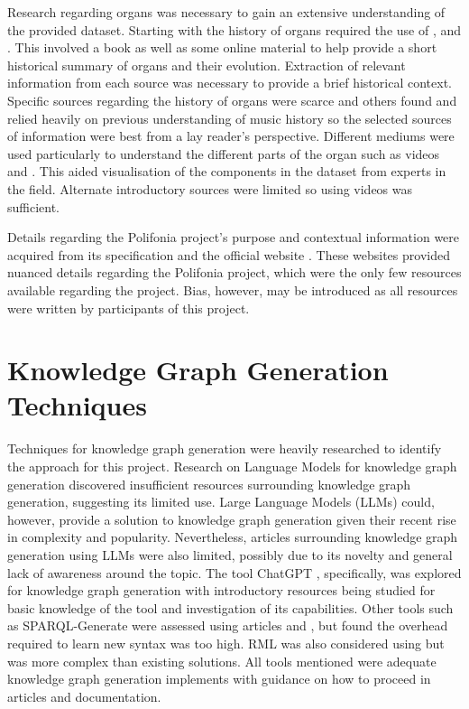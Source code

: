Research regarding organs was necessary to gain an extensive understanding of the provided dataset. Starting with the history of organs required the use of \cite{organhistory}, \cite{organhistory1} and \cite{organmedivalhistory}. This involved a book as well as some online material to help provide a short historical summary of organs and their evolution. Extraction of relevant information from each source was necessary to provide a brief historical context. Specific sources regarding the history of organs were scarce and others found \cite{apel1948early} and \cite{ochse1988history} relied heavily on previous understanding of music history so the selected sources of information were best from a lay reader's perspective. Different mediums were used particularly to understand the different parts of the organ such as videos \cite{organvideo} and \cite{organvideo1}. This aided visualisation of the components in the dataset from experts in the field. Alternate introductory sources were limited so using videos was sufficient. 

Details regarding the Polifonia project's purpose and contextual information were acquired from its specification \cite{polifoniaproject} and the official website \cite{polifonia}. These websites provided nuanced details regarding the Polifonia project, which were the only few resources available regarding the project. Bias, however, may be introduced as all resources were written by participants of this project. 

\section{Knowledge Graph Generation Techniques}
\hspace{0.5cm} Techniques for knowledge graph generation were heavily researched to identify the approach for this project. Research on Language Models for knowledge graph generation discovered insufficient resources surrounding knowledge graph generation, suggesting its limited use. Large Language Models (LLMs) \cite{rouse_2023} could, however, provide a solution to knowledge graph generation given their recent rise in complexity and popularity. Nevertheless, articles surrounding knowledge graph generation using LLMs were also limited, possibly due to its novelty and general lack of awareness around the topic. The tool ChatGPT \cite{chatgptwebsite}, specifically, was explored for knowledge graph generation with introductory resources \cite{chatgpt} being studied for basic knowledge of the tool and investigation of its capabilities. Other tools such as SPARQL-Generate \cite{sparqlgenerate} were assessed using articles \cite{lefranccois2017flexible} and \cite{lefranccois2017sparql}, but found the overhead required to learn new syntax was too high. RML \cite{rml} was also considered using \cite{dimou2014rml} but was more complex than existing solutions. All tools mentioned were adequate knowledge graph generation implements with guidance on how to proceed in articles and documentation. 

